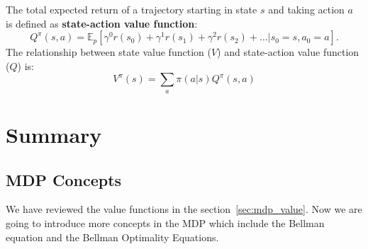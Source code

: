 \documentclass[11pt]{article}
\begin{document}
The total expected return of a trajectory starting in state $s$ and taking action $a$ is defined as \textbf{state-action value function}:
$$Q^{\pi}(s,a) = \mathbb{E}_p [\gamma^0 r(s_0) + \gamma^1 r(s_1)+\gamma^2 r(s_2)+...|s_0=s,a_0=a].$$
The relationship between state value function ($V$) and state-action value function ($Q$) is:
$$V^{\pi}(s) = \sum_a \pi (a|s) Q^{\pi} (s,a)$$

\section{Summary}
\subsection{MDP Concepts}
We have reviewed the value functions in the section~\ref{sec:mdp_value}. Now we are going to introduce more concepts in the MDP which include the Bellman equation and the Bellman Optimality Equations.
 
\end{document}
